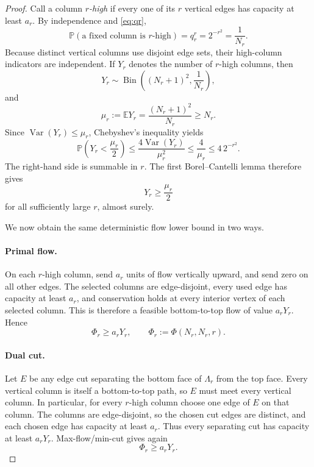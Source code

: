 \documentclass[11pt]{article}
\newcommand{\Pp}{\mathbb P}
\newcommand{\Ee}{\mathbb E}
\begin{document}
\begin{proof}
Call a column \emph{\(r\)-high} if every one of its \(r\) vertical edges has capacity at least \(a_r\).  By independence and \eqref{eq:qr},
\begin{equation}
\label{eq:phigh}
  \Pp(\text{a fixed column is \(r\)-high})
  =q_r^r
  =2^{-r^2}
  =\frac1{N_r}.
\end{equation}
Because distinct vertical columns use disjoint edge sets, their high-column indicators are independent.  If \(Y_r\) denotes the number of \(r\)-high columns, then
\[
  Y_r\sim\operatorname{Bin}\left((N_r+1)^2,\frac1{N_r}\right),
\]
and
\begin{equation}
\label{eq:mu}
  \mu_r:=\Ee Y_r
  =\frac{(N_r+1)^2}{N_r}
  \ge N_r.
\end{equation}
Since \(\operatorname{Var}(Y_r)\le\mu_r\), Chebyshev's inequality yields
\begin{equation}
\label{eq:cheb}
  \Pp\left(Y_r<\frac{\mu_r}{2}\right)
  \le \frac{4\operatorname{Var}(Y_r)}{\mu_r^2}
  \le \frac4{\mu_r}
  \le 4\,2^{-r^2}.
\end{equation}
The right-hand side is summable in \(r\).  The first Borel--Cantelli lemma therefore gives
\begin{equation}
\label{eq:bc}
  Y_r\ge\frac{\mu_r}{2}
\end{equation}
for all sufficiently large \(r\), almost surely.

We now obtain the same deterministic flow lower bound in two ways.

\paragraph{Primal flow.}
On each \(r\)-high column, send \(a_r\) units of flow vertically upward, and send zero on all other edges.  The selected columns are edge-disjoint, every used edge has capacity at least \(a_r\), and conservation holds at every interior vertex of each selected column.  This is therefore a feasible bottom-to-top flow of value \(a_rY_r\).  Hence
\begin{equation}
\label{eq:primal}
  \Phi_r\ge a_rY_r,
  \qquad
  \Phi_r:=\Phi(N_r,N_r,r).
\end{equation}

\paragraph{Dual cut.}
Let \(E\) be any edge cut separating the bottom face of \(\Lambda_r\) from the top face.  Every vertical column is itself a bottom-to-top path, so \(E\) must meet every vertical column.  In particular, for every \(r\)-high column choose one edge of \(E\) on that column.  The columns are edge-disjoint, so the chosen cut edges are distinct, and each chosen edge has capacity at least \(a_r\).  Thus every separating cut has capacity at least \(a_rY_r\).  Max-flow/min-cut gives again
\begin{equation}
\label{eq:dual}
  \Phi_r\ge a_rY_r.
\end{equation}


\end{proof}
\end{document}
